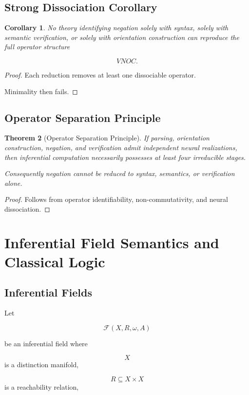 \documentclass[12pt]{article}
\newtheorem{theorem}{Theorem}[section]
\newtheorem{corollary}[theorem]{Corollary}
\theoremstyle{remark}
\begin{document}
\subsection{Strong Dissociation Corollary}

\begin{corollary}
No theory identifying negation solely with syntax, solely with semantic verification, or solely with orientation construction can reproduce the full operator structure

\[
VNOC.
\]
\end{corollary}
\begin{proof}
Each reduction removes at least one dissociable operator.

Minimality then fails.
\end{proof}

\subsection{Operator Separation Principle}

\begin{theorem}[Operator Separation Principle]
If parsing, orientation construction, negation, and verification admit independent neural realizations, then inferential computation necessarily possesses at least four irreducible stages.

Consequently negation cannot be reduced to syntax, semantics, or verification alone.
\end{theorem}

\begin{proof}
Follows from operator identifiability, non-commutativity, and neural dissociation.
\end{proof}

\section{Inferential Field Semantics and Classical Logic}

\subsection{Inferential Fields}

Let

\[
\mathcal F
(X,R,\omega,A)
\]

be an inferential field where

\[
X
\]
is a distinction manifold,

\[
R
\subseteq
X\times X
\]
is a reachability relation,
\end{document}
